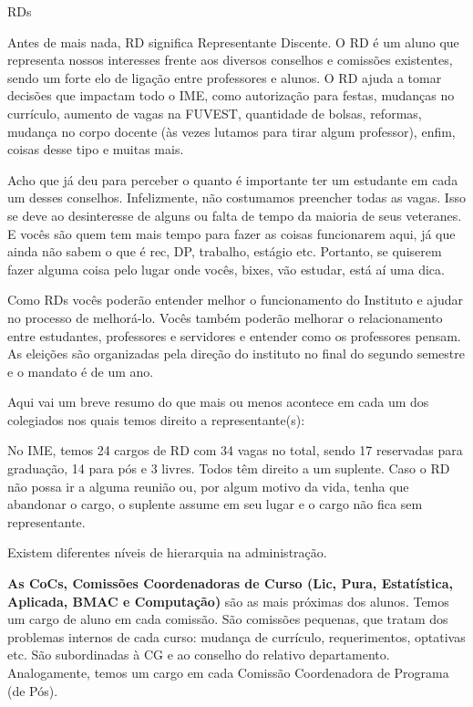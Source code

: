 \begin{subsecao}{RDs}

Antes de mais nada, RD significa Representante Discente. O RD é um aluno que
representa nossos interesses frente aos diversos conselhos e comissões
existentes, sendo um forte elo de ligação entre professores e alunos. O RD
ajuda a tomar decisões que impactam todo o IME, como autorização para festas,
mudanças no currículo, aumento de vagas na FUVEST, quantidade de bolsas,
reformas, mudança no corpo docente (às vezes lutamos para tirar algum
professor), enfim, coisas desse tipo e muitas mais.

Acho que já deu para perceber o quanto é importante ter um estudante em cada um
desses conselhos. Infelizmente, não costumamos preencher todas as vagas. Isso se
deve ao desinteresse de alguns ou falta de tempo da maioria de seus veteranes.
E vocês são quem tem mais tempo para fazer as coisas funcionarem aqui, já que
ainda não sabem o que é rec, DP, trabalho, estágio etc. Portanto, se quiserem
fazer alguma coisa pelo lugar onde vocês, bixes, vão estudar, está aí
uma dica.

Como RDs vocês poderão entender melhor o funcionamento do Instituto e ajudar no
processo de melhorá-lo. Vocês também poderão melhorar o relacionamento entre
estudantes, professores e servidores e entender como os professores pensam.
As eleições são organizadas pela direção do instituto no final do segundo
semestre e o mandato é de um ano.

Aqui vai um breve resumo do que mais ou menos acontece em cada um dos colegiados
nos quais temos direito a representante(s):

No IME, temos 24 cargos de RD com 34 vagas no total, sendo 17 reservadas
para graduação, 14 para pós e 3 livres. Todos têm direito a um suplente.
Caso o RD não possa ir a alguma reunião ou, por algum motivo da vida, tenha
que abandonar o cargo, o suplente assume em seu lugar e o cargo não fica
sem representante.

Existem diferentes níveis de hierarquia na administração.

{\bf As CoCs,
Comissões Coordenadoras de Curso (Lic, Pura, Estatística, Aplicada, BMAC e
Computação)} são as mais próximas dos alunos. Temos um cargo de aluno em cada
comissão. São comissões pequenas, que tratam dos problemas internos de cada
curso: mudança de currículo, requerimentos, optativas etc. São subordinadas
à CG e ao conselho do relativo departamento. Analogamente, temos um cargo em cada
Comissão Coordenadora de Programa (de Pós).


\end{subsecao}
